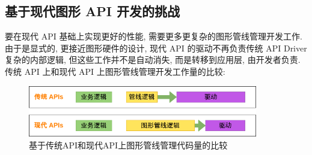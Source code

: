 \documentclass[UTF8]{ctexart}
\begin{document}
\subsection{基于现代图形 API 开发的挑战}
要在现代 API 基础上实现更好的性能, 需要更多更复杂的图形管线管理开发工作. 由于是显式的, 更接近图形硬件的设计, 现代 API 的驱动不再负责传统 API Driver 复杂的内部逻辑, 但这些工作并不是自动消失, 而是转移到应用层, 由开发者负责. 传统 API 上和现代 API 上图形管线管理开发工作量的比较:
\begin{figure}[H]
  \includegraphics[width=10cm]{graphics_works.png}
  \centering
  \caption{基于传统API和现代API上图形管线管理代码量的比较}
  \label{fig:works_comparation}
\end{figure}
\end{document}

